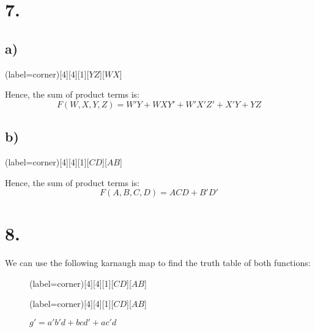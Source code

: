 \documentclass[a4paper,12pt]{article}
\begin{document}
\section*{7.}
\subsection*{a)}
\begin{center}
	\begin{karnaugh-map}(label=corner)[4][4][1][$YZ$][$WX$]
		\autoterms[0]
	\end{karnaugh-map}
\end{center}
Hence, the sum of product terms is:
\begin{equation*}
	\boxed{F(W,X,Y,Z) = W'Y+WXY'+W'X'Z'+X'Y+YZ}
\end{equation*}

\subsection*{b)}
\begin{center}
	\begin{karnaugh-map}(label=corner)[4][4][1][$CD$][$AB$]
		\autoterms[1]
		\implicantcorner
	\end{karnaugh-map}
\end{center}
Hence, the sum of product terms is:
\begin{equation*}
	\boxed{F(A,B,C,D) = ACD+B'D'}
\end{equation*}

\section*{8.}
We can use the following karnaugh map to find the truth table of both functions:
\begin{figure}[H]
		\begin{minipage}{0.5\textwidth}
			\centering
			\begin{karnaugh-map}(label=corner)[4][4][1][$CD$][$AB$]
				\autoterms[0]
			\end{karnaugh-map}
			\caption*{$f = abd' + c'd + a'cd' + b'cd'$}
		\end{minipage}
		\begin{minipage}{0.5\textwidth}
			\centering
			\begin{karnaugh-map}(label=corner)[4][4][1][$CD$][$AB$]
				\autoterms[1]
			\end{karnaugh-map}
			\caption*{$g'=a'b'd+bcd'+ac'd$}
		\end{minipage}
\end{figure}
\end{document}
